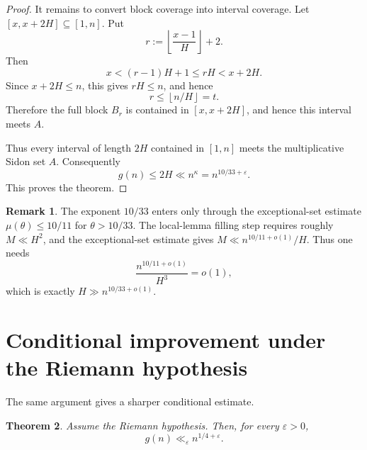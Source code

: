 \documentclass[11pt,reqno]{amsart}
\numberwithin{equation}{section}
\theoremstyle{plain}
\newtheorem{theorem}{Theorem}[section]
\theoremstyle{definition}
\newtheorem{remark}[theorem]{Remark}
\newcommand{\eps}{\varepsilon}
\newcommand{\floor}[1]{\left\lfloor #1\right\rfloor}
\begin{document}
\begin{proof}
It remains to convert block coverage into interval coverage.  Let
$[x,x+2H]\subseteq[1,n]$.  Put
\[
        r:=\floor{\frac{x-1}{H}}+2.
\]
Then
\[
        x < (r-1)H+1\le rH < x+2H.
\]
Since \(x+2H\le n\), this gives \(rH\le n\), and hence
\[
        r\le \floor{n/H}=t.
\]
Therefore the full block \(B_r\) is contained in \([x,x+2H]\), and hence this
interval meets \(A\).

Thus every interval of length $2H$ contained in $[1,n]$ meets the multiplicative
Sidon set $A$.  Consequently
\[
        g(n)\le 2H\ll n^\kappa=n^{10/33+\eps}.
\]
This proves the theorem.
\end{proof}

\begin{remark}
The exponent $10/33$ enters only through the exceptional-set estimate
$\mu(\theta)\le10/11$ for $\theta>10/33$.  The local-lemma filling step requires
roughly $M\ll H^2$, and the exceptional-set estimate gives
$M\ll n^{10/11+o(1)}/H$.  Thus one needs
\[
        \frac{n^{10/11+o(1)}}{H^3}=o(1),
\]
which is exactly $H\gg n^{10/33+o(1)}$.
\end{remark}





\section{Conditional improvement under the Riemann hypothesis}

The same argument gives a sharper conditional estimate.

\begin{theorem}
\label{thm:RH-main}
Assume the Riemann hypothesis.  Then, for every $\eps>0$,
\[
        g(n)\ll_\eps n^{1/4+\eps}.
\]
\end{theorem}
\end{document}
